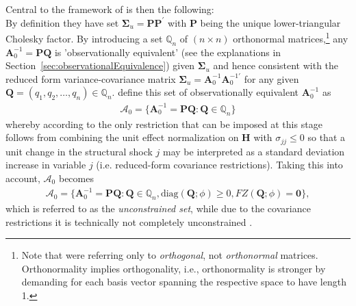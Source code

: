 \documentclass[a4paper,11pt,listof=nochaptergap,oneside,pointednumbers,bibtotoc,bigheadings,liststotoc,hidelinks]{scrbook}
\theoremstyle{mysatz}
\theoremstyle{mydefinition}
\theoremstyle{mytheorem}
\theoremstyle{mybemerkung}
\newcommand{\vect}[1]{\boldsymbol{\mathbf{#1}}}
\begin{document}
Central to the framework of \citet{ludvigsonetal:18,ludvigsonetal:19} is then the following: \\
By definition they have set $\vect{\Sigma}_u = \vect{P}\vect{P}^'$ with $\vect{P}$ being the unique lower-triangular Cholesky factor. By introducing a set $\mathbb{Q}_n$ of $(n \times n)$ orthonormal matrices,\footnote{Note that \citet{rubioetal:10} were referring only to \textit{orthogonal}, not \textit{orthonormal} matrices. Orthonormality implies orthogonality, i.e., orthonormality is stronger by demanding for each basis vector spanning the respective space to have length 1.} any $\vect{A}_0^{-1} = \vect{P}\vect{Q}$ is 'observationally equivalent' (see the explanations in Section~\ref{sec:observationalEquivalence}) given $\vect{\Sigma}_u$ and hence consistent with the reduced form variance-covariance matrix $\vect{\Sigma}_u = \vect{A}_0^{-1}\vect{A}_0^{-1'}$ for any given $\vect{Q} = (q_1, q_2, \dots, q_n) \in \mathbb{Q}_n$. \citet{ludvigsonetal:18,ludvigsonetal:19} define this set of observationally equivalent $\vect{A}_0^{-1}$ as 
\begin{equation} \label{eq:svar_ludvi6}
\begin{split}
 			\mathcal{A}_0 = \{\vect{A}_0^{-1} = \vect{P}\vect{Q}: \vect{Q} \in \mathbb{Q}_n\}
\end{split}								
\end{equation}
whereby according to \citet{ludvigsonetal:18, ludvigsonetal:19} the only restriction that can be imposed at this stage follows from combining the unit effect normalization on $\vect{H}$ with $\sigma_{jj} \leq 0$ so that a unit change in the structural shock $j$ may be interpreted as a standard deviation increase in variable $j$ (i.e. reduced-form covariance restrictions). Taking this into account, $\mathcal{A}_0$ becomes
\begin{equation} \label{eq:svar_ludvi7}
\begin{split}
 			\vect{\mathcal{A}}_0 = \{\vect{A}_0^{-1} = \vect{P}\vect{Q}: \vect{Q} \in \mathbb{Q}_n, \text{diag}(\vect{Q}; \phi) \geq 0, FZ(\vect{Q}; \phi) = \vect{0}\},
\end{split}								
\end{equation}
which is referred to as the \textit{unconstrained set}, while due to the covariance restrictions it is technically not completely unconstrained \citep{ludvigsonetal:19}.
\end{document}
